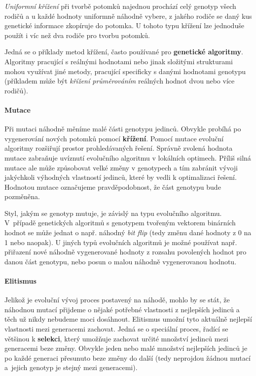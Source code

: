 \emph{Uniformní křížení} při tvorbě potomků najednou prochází celý genotyp
všech rodičů a u každé hodnoty uniformně náhodně vybere, z jakého rodiče se
daný kus genetické informace zkopíruje do potomka. U tohoto typu křížení lze
jednoduše použít i víc než dva rodiče pro tvorbu potomků.

Jedná se o příklady metod křížení, často používané pro \textbf{genetické
algoritmy}. Algoritmy pracující s reálnými hodnotami nebo jinak složitými
strukturami mohou využívat jiné metody, pracující specificky s danými hodnotami
genotypu (příkladem může být \emph{křížení průměrováním} reálných hodnot dvou
nebo více rodičů). 

\paragraph{Mutace}
Při mutaci náhodně měníme malé části genotypu jedinců. Obvykle probíhá po
vygenerování nových potomků pomocí \textbf{křížení}. Pomocí mutace evoluční
algoritmy rozšiřují prostor prohledávaných řešení. Správně zvolená hodnota
mutace zabraňuje uvíznutí evolučního algoritmu v lokálních optimech. Příliš
silná mutace ale může způsobovat velké změny v genotypech a tím zabránit
vývoji jakýchkoli výhodných vlastností jedinců, které by vedli k optimalizaci
řešení. Hodnotou mutace označujeme pravděpodobnost, že část genotypu bude
pozměněna.

Styl, jakým se genotyp mutuje, je závislý na typu evolučního algoritmu.
V~případě genetických algoritmů s genotypem tvořeným vektorem binárních hodnot
se může jednat o např. náhodný \emph{bit flip} (tedy změnu dané hodnoty z 0 na
1 nebo naopak). U jiných typů evolučních algoritmů je možné používat např.
přiřazení nové náhodně vygenerované hodnoty z rozsahu povolených hodnot pro
danou část genotypu, nebo posun o malou náhodně vygenerovanou hodnotu.

\paragraph{Elitismus}
Jelikož je evoluční vývoj proces postavený na náhodě, mohlo by se stát, že
náhodnou mutací přijdeme o nějaké potřebné vlastnosti z nejlepších jedinců a
těch už nikdy nebudeme moci dosáhnout. Elitismus umožní tyto aktuálně nejlepší
vlastnosti mezi generacemi zachovat. Jedná se o speciální proces, řadící se
většinou k \textbf{selekci}, který umožňuje zachovat určité množství jedinců
mezi generacemi beze změny. Obvykle jeden nebo malé množství nejlepších jedinců
je po každé generaci přesunuto beze změny do další (tedy neprojdou žádnou
mutací a~jejich genotyp je stejný mezi generacemi). 

